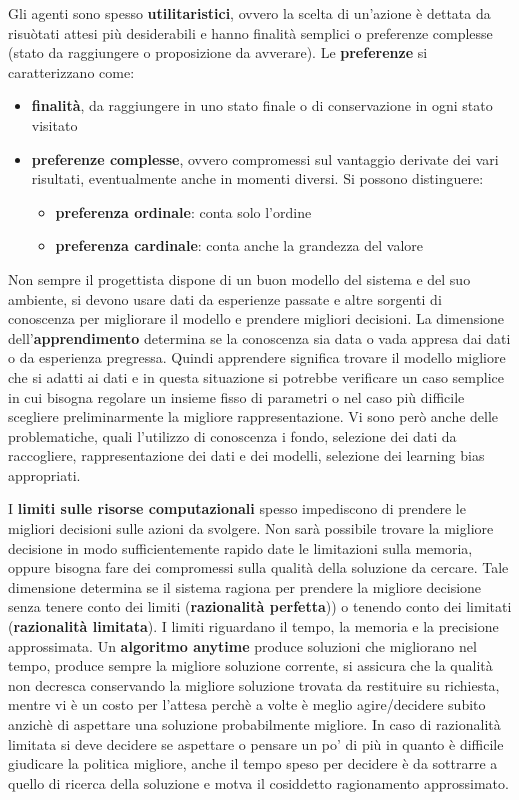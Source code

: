 \documentclass[a4paper]{extarticle}
\begin{document}
Gli agenti sono spesso \textbf{utilitaristici}, ovvero la scelta di un'azione è dettata da risuòtati attesi più desiderabili e hanno finalità semplici o preferenze complesse (stato da raggiungere o proposizione da avverare). Le \textbf{preferenze} si caratterizzano come:
\begin{itemize}
\item \textbf{finalità}, da raggiungere in uno stato finale o di conservazione in ogni stato visitato
\item \textbf{preferenze complesse}, ovvero compromessi sul vantaggio derivate dei vari risultati, eventualmente anche in momenti diversi. Si possono distinguere:
	\begin{itemize}
		\item \textbf{preferenza ordinale}: conta solo l'ordine
		\item \textbf{preferenza cardinale}: conta anche la grandezza del valore
	\end{itemize}
\end{itemize}

Non sempre il progettista dispone di un buon modello del sistema e del suo ambiente, si devono usare dati da esperienze passate e altre sorgenti di conoscenza per migliorare il modello e prendere migliori decisioni. La dimensione dell'\textbf{apprendimento} determina se la conoscenza sia data o vada appresa dai dati o da esperienza pregressa. Quindi apprendere significa trovare il modello migliore che si adatti ai dati e  in questa situazione si potrebbe verificare un caso semplice in cui bisogna regolare un insieme fisso di parametri o nel caso più difficile scegliere preliminarmente la migliore rappresentazione. Vi sono però anche delle problematiche, quali l'utilizzo di conoscenza i fondo, selezione dei dati da raccogliere, rappresentazione dei dati e dei modelli, selezione dei learning bias appropriati.

I \textbf{limiti sulle risorse computazionali} spesso impediscono di prendere le migliori decisioni sulle azioni da svolgere. Non sarà possibile trovare la migliore decisione in modo sufficientemente rapido date le limitazioni sulla memoria, oppure bisogna fare dei compromessi sulla qualità della soluzione da cercare. Tale dimensione determina se il sistema ragiona per prendere la migliore decisione senza tenere conto dei limiti (\textbf{razionalità perfetta})) o tenendo conto dei limitati (\textbf{razionalità limitata}). I limiti riguardano il tempo, la memoria e la precisione approssimata. Un \textbf{algoritmo anytime} produce soluzioni che migliorano nel tempo, produce sempre la migliore soluzione corrente, si assicura che la qualità non decresca conservando la migliore soluzione trovata da restituire su richiesta, mentre vi è un costo per l'attesa perchè a volte è meglio agire/decidere subito anzichè di aspettare una soluzione probabilmente migliore. In caso di razionalità limitata si deve decidere se aspettare o pensare un po' di più in quanto è difficile giudicare la politica migliore, anche il tempo speso per decidere è da sottrarre a quello di ricerca della soluzione e motva il cosiddetto ragionamento approssimato.
\end{document}
